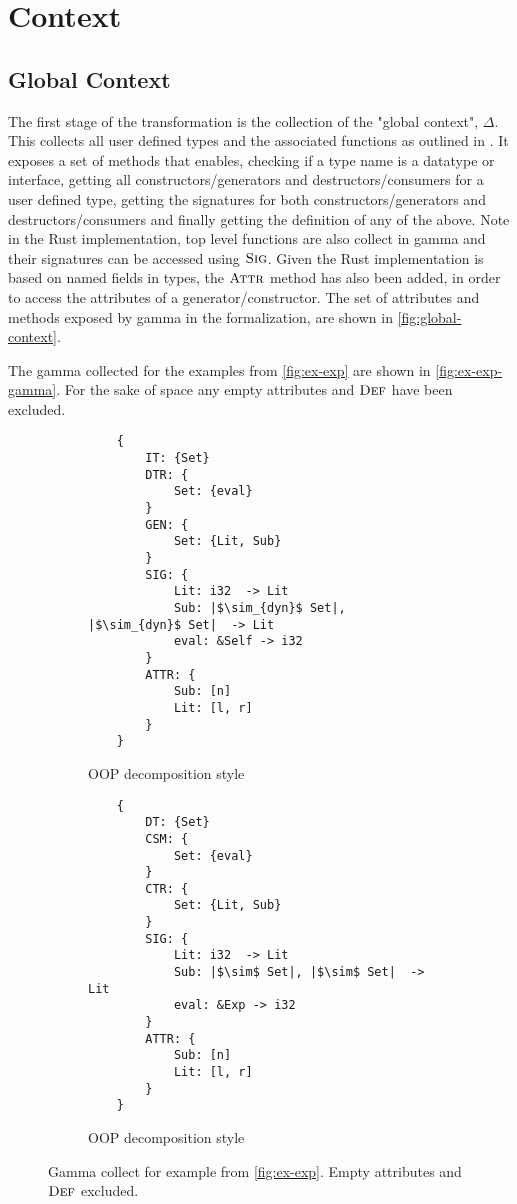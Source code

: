 \documentclass[ oneside,%
                    author={James Elgar},
                    degree={MEng},
                     title={Bidirectional transformer between functional and \\ object-oriented programming in Rust},
                  subtitle={}]{dissertation}
\begin{document}
\section{Context}

\subsection{Global Context}

The first stage of the transformation is the collection of the "global context", $\Delta$. This collects all user defined types and the associated functions as outlined in \cite{food}. It exposes a set of methods that enables, checking if a type name is a datatype or interface, getting all constructors/generators and destructors/consumers for a user defined type, getting the signatures for both constructors/generators and destructors/consumers and finally getting the definition of any of the above. Note in the Rust implementation, top level functions are also collect in gamma and their signatures can be accessed using $\textsc{Sig}$. Given the Rust implementation is based on named fields in types, the $\textsc{Attr}$ method has also been added, in order to access the attributes of a generator/constructor. 
The set of attributes and methods exposed by gamma in the formalization, are shown in \autoref{fig:global-context}.

The gamma collected for the examples from \autoref{fig:ex-exp} are shown in \autoref{fig:ex-exp-gamma}. For the sake of space any empty attributes and $\textsc{Def}$ have been excluded.

\begin{figure}[H]
\centering
\begin{subfigure}{.5\textwidth}
    \begin{verbatim}
    {
        IT: {Set}
        DTR: {
            Set: {eval}
        }
        GEN: {
            Set: {Lit, Sub}
        }
        SIG: {
            Lit: i32  -> Lit 
            Sub: |$\sim_{dyn}$ Set|, |$\sim_{dyn}$ Set|  -> Lit 
            eval: &Self -> i32 
        }
        ATTR: {
            Sub: [n]
            Lit: [l, r]
        }
    }
    \end{verbatim}
    \caption{OOP decomposition style}
\end{subfigure}%
\begin{subfigure}{.5\textwidth}
    \begin{verbatim}
    {
        DT: {Set}
        CSM: {
            Set: {eval}
        }
        CTR: {
            Set: {Lit, Sub}
        }
        SIG: {
            Lit: i32  -> Lit 
            Sub: |$\sim$ Set|, |$\sim$ Set|  -> Lit 
            eval: &Exp -> i32 
        }
        ATTR: {
            Sub: [n]
            Lit: [l, r]
        }
    }
    \end{verbatim}
    \caption{OOP decomposition style}
\end{subfigure}
\caption{Gamma collect for example from \autoref{fig:ex-exp}. Empty attributes and $\textsc{Def}$ excluded.}
\label{fig:ex-exp-gamma}
\end{figure}
\end{document}
